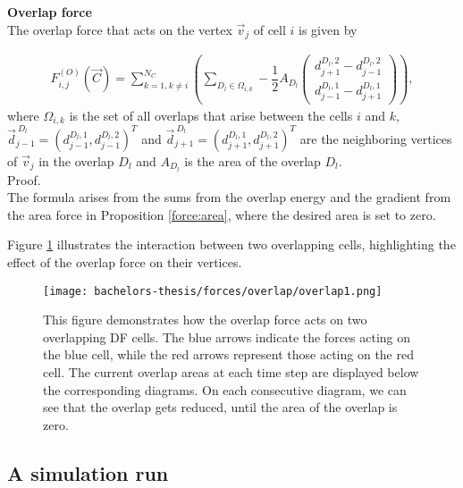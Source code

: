\begin{proposition} \textbf{Overlap force} \\
	The overlap force that acts on the vertex $\vec{v}_j$ of cell $i$ is given by 

	\begin{align}
		F_{i,j}^{(O)}(\vec{C}) = \sum\limits_{k=1, k \neq i}^{N_C} \left( \sum\limits_{D_l \in \Omega_{i,k}} -\dfrac{1}{2} A_{D_l} \begin{pmatrix} d_{j+1}^{D_l, 2} - d_{j-1}^{D_l, 2} \\[0.5em]  d_{j-1}^{D_l, 1} - d_{j+1}^{D_l, 1} \end{pmatrix} \right),
	\end{align}
	where $\Omega_{i,k}$ is the set of all overlaps that arise between the cells $i$ and $k$, $\vec{d}_{j-1}^{\: D_l} = (d_{j-1}^{D_l, 1}, d_{j-1}^{D_l, 2})^T$ and $\vec{d}_{j+1}^{\: D_l} = (d_{j+1}^{D_l, 1}, d_{j+1}^{D_l, 2})^T$ are the neighboring vertices of $\vec{v}_j$ in the overlap $D_l$ and $A_{D_l}$ is the area of the overlap $D_l$. \\

	Proof. \\
	The formula arises from the sums from the overlap energy and the gradient from the area force in Proposition \ref{force:area}, where the desired area is set to zero. 
\end{proposition}

Figure \ref{fig:overlapForce} illustrates the interaction between two overlapping cells, highlighting the effect of the overlap force on their vertices.
\begin{figure}[h!]
	\begin{center}
		\texttt{[image: bachelors-thesis/forces/overlap/overlap1.png]}
			\caption{This figure demonstrates how the overlap force acts on two overlapping DF cells.
			The blue arrows indicate the forces acting on the blue cell, while the red arrows represent those acting on the red cell.
			The current overlap areas at each time step are displayed below the corresponding diagrams.			
			On each consecutive diagram, we can see that the overlap gets reduced, until the area of the overlap is zero.  }
			\label{fig:overlapForce}
	\end{center}
\end{figure}


\subsection{A simulation run}
